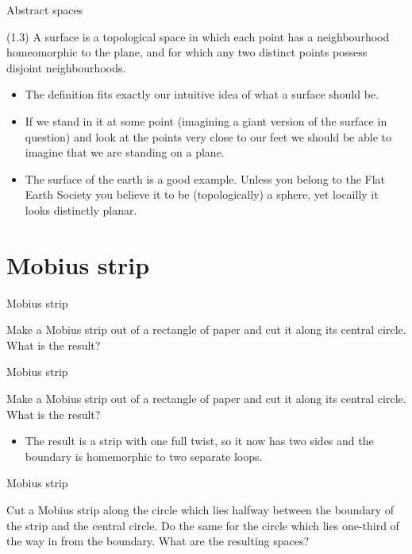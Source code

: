 \documentclass{beamer}
\begin{document}
\begin{frame}{Abstract spaces}
  \begin{definition}[Surface]
    (1.3) A surface is a topological space in which each point has a neighbourhood homeomorphic to the plane, and for which any two distinct points possess disjoint neighbourhoods.
    \begin{itemize}
    \item The definition fits exactly our intuitive idea of what a surface should be.
    \item If we stand in it at some point (imagining a giant version of the surface in question) and look at the points very close to our feet we should be able to imagine that we are standing on a plane.
    \item The surface of the earth is a good example. Unless you belong to the Flat Earth Society you believe it to be (topologically) a sphere, yet locailly it looks distinctly planar.
    \end{itemize}
  \end{definition}
\end{frame}

\section{Mobius strip}

\begin{frame}{Mobius strip}
  \begin{block}{}
    Make a Mobius strip out of a rectangle of paper and cut it along its central circle. What is the result?
  \end{block}
\end{frame}

\begin{frame}{Mobius strip}
  \begin{block}{}
    Make a Mobius strip out of a rectangle of paper and cut it along its central circle. What is the result?
    \begin{itemize}
    \item The result is a strip with one full twist, so it now has two sides and the boundary is homemorphic to two separate loops.
    \end{itemize}
  \end{block}
\end{frame}

\begin{frame}{Mobius strip}
  \begin{block}{}
    Cut a Mobius strip along the circle which lies halfway between the boundary of the strip and the central circle. Do the same for the circle which lies one-third of the way in from the boundary. What are the resulting spaces?
  \end{block}
\end{frame}
\end{document}
